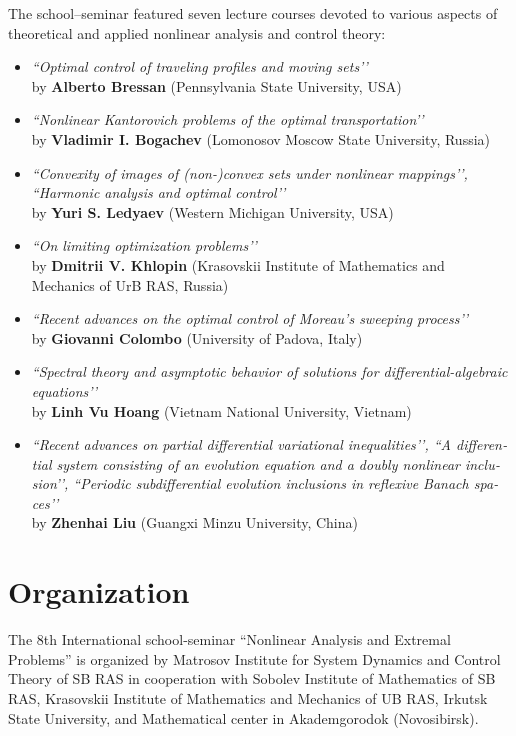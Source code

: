 \documentclass[12pt,final]{llncs}
\begin{document}
\begin{english}
\begin{itemize}
\end{itemize}
The school--seminar featured seven lecture courses devoted to various aspects of theoretical and applied nonlinear analysis and control theory:
\begin{itemize}
\item \emph{``Optimal control of traveling profiles and moving sets’’}\\ by  \textbf{Alberto Bressan} (Pennsylvania State University, USA)\smallskip
\item \emph{``Nonlinear Kantorovich problems of the optimal transportation’’}\\ by  \textbf{Vladimir I. Bogachev} (Lomonosov Moscow State University, Russia)\smallskip
\item \emph{``Convexity of images of (non-)convex sets under nonlinear mappings’’, ``Harmonic analysis and optimal control’’}\\ by \textbf{Yuri S. Ledyaev} (Western Michigan University, USA)\smallskip
\item \emph{``On limiting optimization problems’’}\\ by  \textbf{Dmitrii V. Khlopin } (Krasovskii Institute of Mathematics and Mechanics of UrB RAS, Russia)\smallskip
\item \emph{``Recent advances on the optimal control of Moreau's sweeping process’’}\\ by \textbf{Giovanni Colombo} (University of Padova, Italy)\smallskip
\item \emph{``Spectral theory and asymptotic behavior of solutions for differential-algebraic equations’’}\\ by \textbf{Linh Vu Hoang} (Vietnam National University, Vietnam)\smallskip
\item \emph{``Recent advances on partial differential variational inequalities’’, ``A differential system consisting of an evolution equation and a doubly nonlinear inclusion’’, ``Periodic subdifferential evolution inclusions in reflexive Banach spaces’’}\\ by \textbf{Zhenhai Liu} (Guangxi Minzu University, China)\smallskip
\end{itemize}

\end{english}

%
\chapter*{Organization}
\vspace{-2em}
 \begin{englisharticle}
The 8th International school-seminar ``Nonlinear Analysis and Extremal Problems'' is organized by Matrosov
Institute for System Dynamics and Control Theory of SB RAS in cooperation with
Sobolev Institute of Mathematics  of SB RAS,
  Krasovskii Institute of Mathematics and Mechanics of UB RAS,
 	Irkutsk State University, and Mathematical center in Akademgorodok (Novosibirsk).
 \end{englisharticle}
\end{document}
